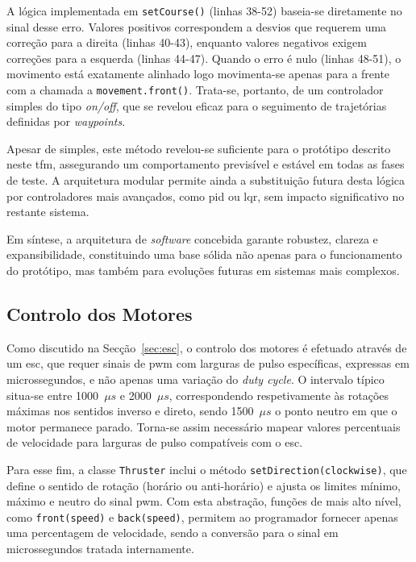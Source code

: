 A lógica implementada em \texttt{setCourse()} (linhas 38-52) baseia-se diretamente no sinal desse erro. Valores positivos correspondem a desvios que requerem uma correção para a direita (linhas 40-43), enquanto valores negativos exigem correções para a esquerda (linhas 44-47). Quando o erro é nulo (linhas 48-51), o movimento está exatamente alinhado logo movimenta-se apenas para a frente com a chamada a \texttt{movement.front()}. Trata-se, portanto, de um controlador simples do tipo \emph{on/off}, que se revelou eficaz para o seguimento de trajetórias definidas por \emph{waypoints}.

Apesar de simples, este método revelou-se suficiente para o protótipo descrito neste \gls{tfm}, assegurando um comportamento previsível e estável em todas as fases de teste. A arquitetura modular permite ainda a substituição futura desta lógica por controladores mais avançados, como \acrfull{pid} ou \acrfull{lqr}, sem impacto significativo no restante sistema.  

Em síntese, a arquitetura de \emph{software} concebida garante robustez, clareza e expansibilidade, constituindo uma base sólida não apenas para o funcionamento do protótipo, mas também para evoluções futuras em sistemas mais complexos.


\subsection{Controlo dos Motores}
\label{subsec:controlo-de-motores}

Como discutido na Secção~\ref{sec:esc}, o controlo dos motores é efetuado através de um \gls{esc}, que requer sinais de \gls{pwm} com larguras de pulso específicas, expressas em microssegundos, e não apenas uma variação do \emph{duty cycle}. O intervalo típico situa-se entre 1000~\(\mu s\) e 2000~\(\mu s\), correspondendo respetivamente às rotações máximas nos sentidos inverso e direto, sendo 1500~\(\mu s\) o ponto neutro em que o motor permanece parado. Torna-se assim necessário mapear valores percentuais de velocidade para larguras de pulso compatíveis com o \gls{esc}.  

Para esse fim, a classe \texttt{Thruster} inclui o método \texttt{setDirection(clockwise)}, que define o sentido de rotação (horário ou anti-horário) e ajusta os limites mínimo, máximo e neutro do sinal \gls{pwm}. Com esta abstração, funções de mais alto nível, como \texttt{front(speed)} e \texttt{back(speed)}, permitem ao programador fornecer apenas uma percentagem de velocidade, sendo a conversão para o sinal em microssegundos tratada internamente.  

